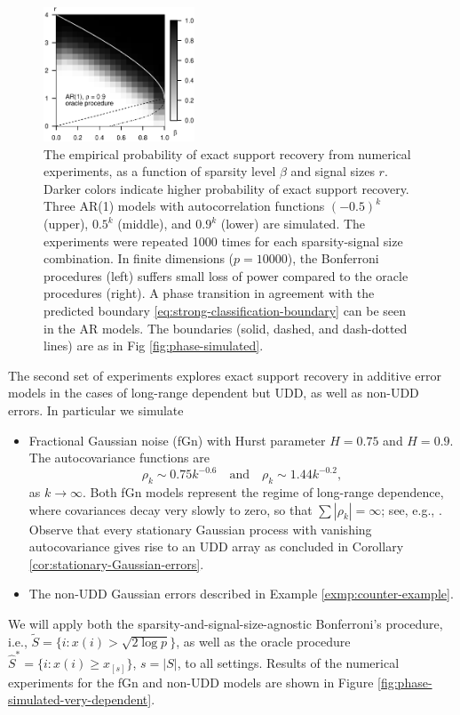 \begin{figure}
    \includegraphics[width=0.4\textwidth]{./figures/simulated_phase_diagram_AR09_p10000_oracle.eps}
    \caption{The empirical probability of exact support recovery from numerical experiments, as a function of sparsity level $\beta$ and signal sizes $r$. Darker colors indicate higher probability of exact support recovery. 
    Three AR(1) models with autocorrelation functions $(-0.5)^k$ (upper), 
    $0.5^k$ (middle), and $0.9^k$ (lower) are simulated.
    The experiments were repeated 1000 times for each sparsity-signal size combination.
    In finite dimensions ($p=10000$), the Bonferroni procedures (left) suffers small loss of power compared to the oracle procedures (right).
    A phase transition in agreement with the predicted boundary \eqref{eq:strong-classification-boundary} can be seen in the AR models.
    The boundaries (solid, dashed, and dash-dotted lines) are as in Fig \ref{fig:phase-simulated}.}
    \label{fig:phase-simulated-dependent}
\end{figure}

\medskip

The second set of experiments explores exact support recovery in additive error models in the cases of long-range dependent but UDD, as well as non-UDD errors.
In particular we simulate
\begin{itemize}
    \item Fractional Gaussian noise (fGn) with Hurst parameter $H = 0.75$ and $H = 0.9$. 
    The autocovariance functions are 
    $$\rho_{k} \sim 0.75k^{-0.6} \quad \text{and} \quad \rho_{k} \sim 1.44k^{-0.2},$$
    as $k\to\infty$.
    Both fGn models represent the regime of long-range dependence, where covariances decay very slowly to zero, so that $\sum|\rho_k| = \infty$; see, e.g., \citep{taqqu2003livre}.
    Observe that every stationary Gaussian process with vanishing autocovariance gives rise to an UDD array as concluded in Corollary \ref{cor:stationary-Gaussian-errors}.
    \item The non-UDD Gaussian errors described in Example \ref{exmp:counter-example}.
\end{itemize}
We will apply both the sparsity-and-signal-size-agnostic Bonferroni's procedure, i.e., $\widetilde{S} = \{i:x(i)>\sqrt{2\log{p}}\}$, as well as the oracle procedure $\widehat{S}^* = \{i:x(i)\ge x_{[s]}\}$, $s=|S|$, to all settings.
Results of the numerical experiments for the fGn and non-UDD models are shown in Figure \ref{fig:phase-simulated-very-dependent}.


